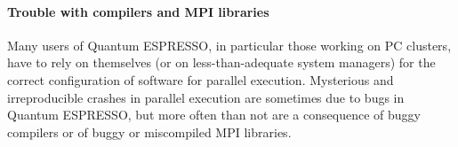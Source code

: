\documentclass[12pt,a4paper]{article}
\def\qe{{\sc Quantum ESPRESSO}}
\begin{document}
\paragraph{Trouble with compilers and MPI libraries}
Many users of \qe, in particular those working on PC clusters,
have to rely on themselves (or on less-than-adequate system managers) for
the correct configuration of software for parallel execution. Mysterious and
irreproducible crashes in parallel execution are sometimes due to bugs
in \qe, but more often than not are a consequence of buggy
compilers or of buggy or miscompiled MPI libraries.
\end{document}
